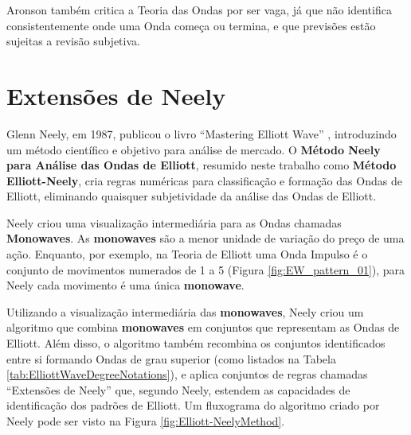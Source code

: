 \documentclass[12pt]{article}
\begin{document}
Aronson \cite{Aroson:2006} também critica a Teoria das Ondas por ser vaga, já que
não identifica consistentemente onde uma Onda começa ou termina, e que previsões estão
sujeitas a revisão subjetiva.

\section{Extensões de Neely} \label{sec:Neely-Extensions}

Glenn Neely, em 1987, publicou o livro ``Mastering Elliott Wave'' \cite{Neely:1990},
introduzindo um método científico e objetivo para análise de mercado.
O \textbf{Método Neely para Análise das Ondas de Elliott}, resumido neste trabalho como
\textbf{Método Elliott-Neely}, cria regras numéricas para classificação e formação das
Ondas de Elliott, eliminando quaisquer subjetividade da análise das Ondas de Elliott.

Neely criou uma visualização intermediária para as Ondas chamadas \textbf{Monowaves}.
As \textbf{monowaves} são a menor unidade de variação do preço de uma ação. Enquanto,
por exemplo, na Teoria de Elliott uma Onda Impulso é o conjunto de movimentos numerados de
1 a 5 (Figura \ref{fig:EW_pattern_01}), para Neely cada movimento é uma única \textbf{monowave}.

Utilizando a visualização intermediária das \textbf{monowaves}, Neely criou um algoritmo
que combina \textbf{monowaves} em conjuntos que representam as Ondas de Elliott. Além disso,
o algoritmo também recombina os conjuntos identificados entre si formando Ondas de grau
superior (como listados na Tabela \ref{tab:ElliottWaveDegreeNotations}), e aplica conjuntos
de regras chamadas ``Extensões de Neely'' que, segundo Neely, estendem as capacidades de
identificação dos padrões de Elliott. Um fluxograma do algoritmo criado por Neely pode ser
visto na Figura \ref{fig:Elliott-NeelyMethod}.
\end{document}

